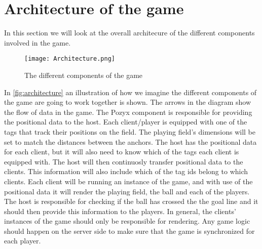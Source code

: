 \section{Architecture of the game}
In this section we will look at the overall architecure of the different components involved in the game.
\begin{figure}[H]
    \centering
    \texttt{[image: Architecture.png]}
    \caption{The different components of the game}
    \label{fig:architecture}
\end{figure}
\noindent
In \autoref{fig:architecture} an illustration of how we imagine the different components of the game are going to work together is shown.
The arrows in the diagram show the flow of data in the game.
The Pozyx component is responsible for providing the positional data to the host. 
Each client/player is equipped with one of the tags that track their positions on the field. 
The playing field's dimensions will be set to match the distances between the anchors. 
The host has the positional data for each client, but it will also need to know which of the tags each client is equipped with.
The host will then continuosly transfer positional data to the clients.
This information will also include which of the tag ids belong to which clients.
Each client will be running an instance of the game, and with use of the positional data it will render the playing field, the ball and each of the players.
The host is responsible for checking if the ball has crossed the the goal line and it should then provide this information to the players.
In general, the clients' instances of the game should only be responsible for rendering.
Any game logic should happen on the server side to make sure that the game is synchronized for each player. 
